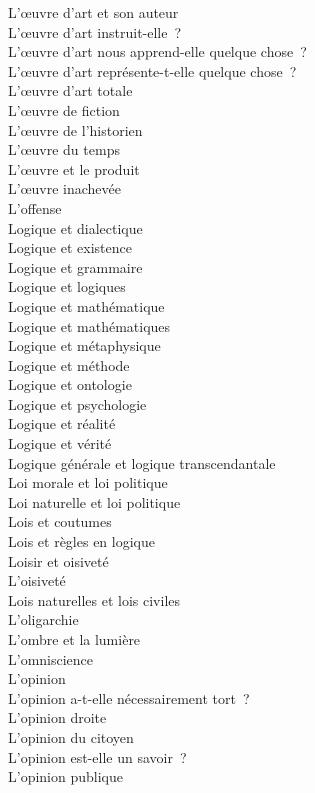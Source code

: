 \documentclass[a4paper,12pt]{article}
\begin{document}
L'œuvre d'art et son auteur \\
L'œuvre d'art instruit-elle ? \\
L'œuvre d'art nous apprend-elle quelque chose ? \\
L'œuvre d'art représente-t-elle quelque chose ? \\
L'œuvre d'art totale \\
L'œuvre de fiction \\
L'œuvre de l'historien \\
L'œuvre du temps \\
L'œuvre et le produit \\
L'œuvre inachevée \\
L'offense \\
Logique et dialectique \\
Logique et existence \\
Logique et grammaire \\
Logique et logiques \\
Logique et mathématique \\
Logique et mathématiques \\
Logique et métaphysique \\
Logique et méthode \\
Logique et ontologie \\
Logique et psychologie \\
Logique et réalité \\
Logique et vérité \\
Logique générale et logique transcendantale \\
Loi morale et loi politique \\
Loi naturelle et loi politique \\
Lois et coutumes \\
Lois et règles en logique \\
Loisir et oisiveté \\
L'oisiveté \\
Lois naturelles et lois civiles \\
L'oligarchie \\
L'ombre et la lumière \\
L'omniscience \\
L'opinion \\
L'opinion a-t-elle nécessairement tort ? \\
L'opinion droite \\
L'opinion du citoyen \\
L'opinion est-elle un savoir ? \\
L'opinion publique \\
\end{document}
